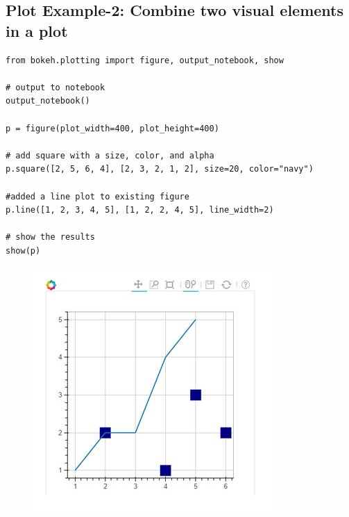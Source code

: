 \documentclass[a4paper,12pt]{article}
\begin{document}
\newpage

\subsection{Plot Example-2: Combine two visual elements in a plot}
\begin{framed}
	\begin{verbatim}
from bokeh.plotting import figure, output_notebook, show

# output to notebook
output_notebook()

p = figure(plot_width=400, plot_height=400)

# add square with a size, color, and alpha
p.square([2, 5, 6, 4], [2, 3, 2, 1, 2], size=20, color="navy")

#added a line plot to existing figure
p.line([1, 2, 3, 4, 5], [1, 2, 2, 4, 5], line_width=2) 

# show the results
show(p)
\end{verbatim}
\end{framed}

\begin{figure}[h!]
\centering
\includegraphics[width=0.7\linewidth]{images/02-plotting-AV-scatterplot-Line}
\caption{}
\label{fig:02-plotting-AV-scatterplot-Line}
\end{figure}


\newpage
\end{document}

